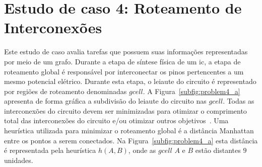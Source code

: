 \section{Estudo de caso 4: Roteamento de Interconexões}
\label{sec:estudo_de_caso_4}

Este estudo de caso avalia tarefas que possuem suas informações representadas por meio de um grafo.
Durante a etapa de síntese física de um \ac{ic}, a etapa de roteamento global é responsável por interconectar os pinos pertencentes a um mesmo potencial elétrico.
Durante esta etapa, o leiaute do circuito é representado por regiões de roteamento denominadas $gcell$.
A Figura~\ref{subfig:problem4_a} apresenta de forma gráfica a subdivisão do leiaute do circuito nas $gcell$.
Todas as interconexões do circuito devem ser minimizadas para otimizar o comprimento total das interconexões do circuito e/ou otimizar outros objetivos~\cite{kahng2011vlsi}.
Uma heurística utilizada para minimizar o roteamento global é a distância Manhattan entre os pontos a serem conectados.
Na Figura~\ref{subfig:problem4_a} esta distância é representada pela heurística $h(A, B)$, onde as $gcell$ $A$ e $B$ estão distantes $9$ unidades.



